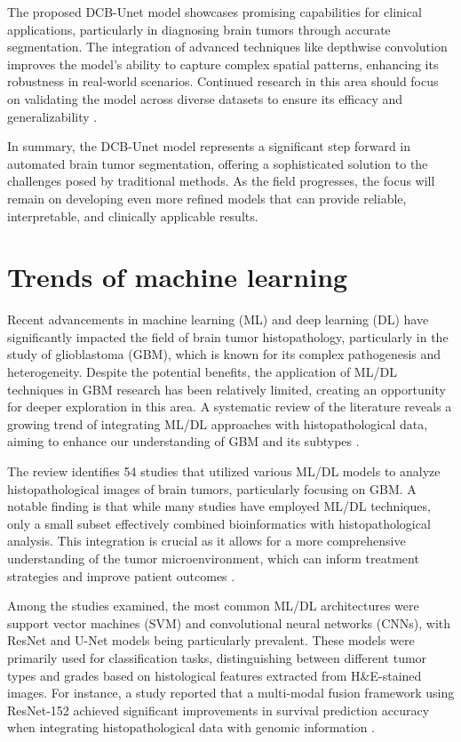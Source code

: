 \documentclass[runningheads]{llncs}
\begin{document}
The proposed DCB-Unet model showcases promising capabilities for clinical applications, particularly in diagnosing brain tumors through accurate segmentation. The integration of advanced techniques like depthwise convolution improves the model's ability to capture complex spatial patterns, enhancing its robustness in real-world scenarios. Continued research in this area should focus on validating the model across diverse datasets to ensure its efficacy and generalizability \cite{Havaei_2017, Daimary_2020}.

In summary, the DCB-Unet model represents a significant step forward in automated brain tumor segmentation, offering a sophisticated solution to the challenges posed by traditional methods. As the field progresses, the focus will remain on developing even more refined models that can provide reliable, interpretable, and clinically applicable results.
\section{Trends of machine learning}
Recent advancements in machine learning (ML) and deep learning (DL) have significantly impacted the field of brain tumor histopathology, particularly in the study of glioblastoma (GBM), which is known for its complex pathogenesis and heterogeneity. Despite the potential benefits, the application of ML/DL techniques in GBM research has been relatively limited, creating an opportunity for deeper exploration in this area. A systematic review of the literature reveals a growing trend of integrating ML/DL approaches with histopathological data, aiming to enhance our understanding of GBM and its subtypes \cite{Chun_2025}.

The review identifies 54 studies that utilized various ML/DL models to analyze histopathological images of brain tumors, particularly focusing on GBM. A notable finding is that while many studies have employed ML/DL techniques, only a small subset effectively combined bioinformatics with histopathological analysis. This integration is crucial as it allows for a more comprehensive understanding of the tumor microenvironment, which can inform treatment strategies and improve patient outcomes \cite{Chun_2025}.

Among the studies examined, the most common ML/DL architectures were support vector machines (SVM) and convolutional neural networks (CNNs), with ResNet and U-Net models being particularly prevalent. These models were primarily used for classification tasks, distinguishing between different tumor types and grades based on histological features extracted from H\&E-stained images. For instance, a study reported that a multi-modal fusion framework using ResNet-152 achieved significant improvements in survival prediction accuracy when integrating histopathological data with genomic information \cite{Chun_2025}. 
\end{document}
